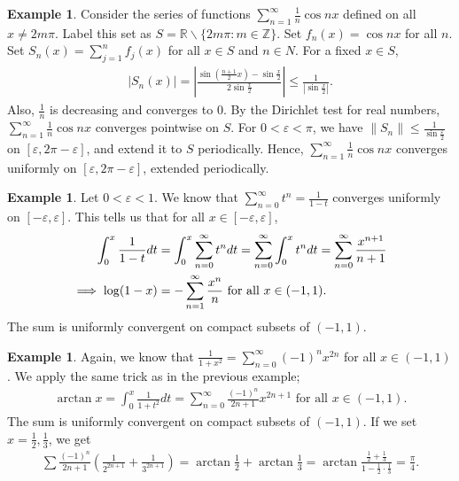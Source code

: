 \documentclass[15pt,a4paper]{book}
\theoremstyle{definition}
\newtheorem{example}[theorem]{Example}
\newcommand{\abs}[1]{\left| #1 \right|} %
\newcommand{\R}{\mathbb{R}} %
\newcommand{\Z}{\mathbb{Z}} %
\newcommand{\norm}[1]{\left\lVert#1\right\rVert}
\begin{document}
\begin{example}
    Consider the series of functions $\sum_{n=1}^{\infty} \frac{1}{n} \cos nx$ defined on all $x \neq 2m\pi$. Label this set as $S = \R \backslash \{2m\pi : m \in \Z\}$. Set $f_{n}(x) = \cos nx$ for all $n$. Set $S_{n}(x) = \sum_{j=1}^{n} f_{j}(x)$ for all $x \in S$ and $n \in N$. For a fixed $x \in S$,
    \begin{align}
        \abs{S_{n}(x)} = \abs{\frac{\sin (\frac{n+1}{2}x) - \sin \frac{x}{2}}{2 \sin \frac{x}{2}}} \leq \frac{1}{\abs{ \sin \frac{x}{2}}}.
    \end{align}
    Also, $\frac{1}{n}$ is decreasing and converges to 0. By the Dirichlet test for real numbers, $\sum_{n=1}^{\infty} \frac{1}{n} \cos nx$ converges pointwise on $S$. For $0 < \varepsilon < \pi$, we have $\norm{S_{n}} \leq \frac{1}{\sin \frac{\varepsilon}{2}}$ on $[\varepsilon, 2\pi - \varepsilon]$, and extend it to $S$ periodically. Hence, $\sum_{n=1}^{\infty} \frac{1}{n} \cos nx$ converges uniformly on $[\varepsilon, 2\pi-\varepsilon]$, extended periodically.
\end{example}

\begin{example}
    Let $0 < \varepsilon < 1$. We know that $\sum_{n=0}^{\infty} t^{n} = \frac{1}{1-t}$ converges uniformly on $[-\varepsilon,\varepsilon]$. This tells us that for all $x \in [-\varepsilon,\varepsilon]$,
    \begin{align}
        \int_{0}^{x} \frac{1}{1-t} dt &= \int_{0}^{x} \sum_{n=0}^{\infty} t^{n} dt = \sum_{n=0}^{\infty} \int_{0}^{x} t^{n} dt = \sum_{n=0}^{\infty} \frac{x^{n+1}}{n+1} \notag \\
        \implies \log(1-x) &= -\sum_{n=1}^{\infty} \frac{x^{n}}{n} \text{ for all } x \in (-1,1).
    \end{align}
    The sum is uniformly convergent on compact subsets of $(-1,1)$.
\end{example}

\begin{example}
    Again, we know that $\frac{1}{1+x^{2}} = \sum_{n=0}^{\infty} (-1)^{n} x^{2n}$ for all $x \in (-1,1)$. We apply the same trick as in the previous example;
    \begin{align}
        \arctan x = \int_{0}^{x} \frac{1}{1+t^{2}}dt = \sum_{n=0}^{\infty} \frac{(-1)^{n}}{2n+1} x^{2n+1} \text{ for all } x \in (-1,1).
    \end{align}
    The sum is uniformly convergent on compact subsets of $(-1,1)$. If we set $x = \frac{1}{2},\frac{1}{3}$, we get
    \begin{align}
        \sum \frac{(-1)^{n}}{2n+1} \left( \frac{1}{2^{2n+1}} + \frac{1}{3^{2n+1}} \right) = \arctan \frac{1}{2} + \arctan \frac{1}{3} = \arctan \frac{\frac{1}{2}+\frac{1}{3}}{1-\frac{1}{2}\cdot \frac{1}{3}} = \frac{\pi}{4}.
    \end{align}
\end{example}
\end{document}
